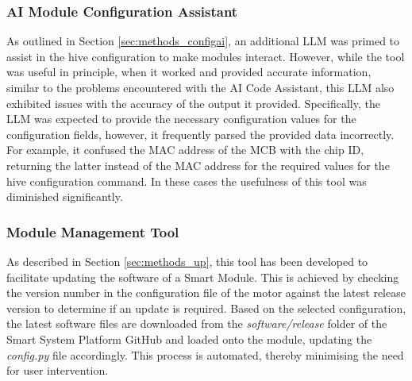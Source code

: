 \subsubsection{\label{sec:res_ai_config}AI Module Configuration Assistant}

As outlined in Section \ref{sec:methods_configai}, an additional LLM was primed to assist in the hive configuration to make modules interact. However, while the tool was useful in principle, when it worked and provided accurate information, similar to the problems encountered with the AI Code Assistant, this LLM also exhibited issues with the accuracy of the output it provided. Specifically, the LLM was expected to provide the necessary configuration values for the configuration fields, however, it frequently parsed the provided data incorrectly. For example, it confused  the MAC address of the MCB with the chip ID, returning the latter instead of the MAC address for the required values for the hive configuration command. In these cases the usefulness of this tool was diminished significantly.

\subsubsection{\label{sec:res_mmt}Module Management Tool}

As described in Section \ref{sec:methods_up}, this tool has been developed to facilitate updating the software of a Smart Module. This is achieved by checking the version number in the configuration file of the motor against the latest release version to determine if an update is required. Based on the selected configuration, the latest software files are downloaded from the \textit{software/release} folder of the Smart System Platform GitHub and loaded onto the module, updating the \textit{config.py} file accordingly. This process is automated, thereby minimising the need for user intervention.



